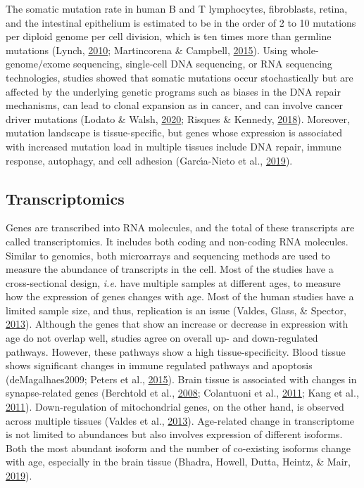 \documentclass[12pt,twoside]{unicam}
\begin{document}
The somatic mutation rate in human B and T lymphocytes, fibroblasts, retina, and the intestinal epithelium is estimated to be in the order of 2 to 10 mutations per diploid genome per cell division, which is ten times more than germline mutations (Lynch, \protect\hyperlink{ref-Lynch2010}{2010}; Martincorena \& Campbell, \protect\hyperlink{ref-Martincorena2015}{2015}). Using whole-genome/exome sequencing, single-cell DNA sequencing, or RNA sequencing technologies, studies showed that somatic mutations occur stochastically but are affected by the underlying genetic programs such as biases in the DNA repair mechanisms, can lead to clonal expansion as in cancer, and can involve cancer driver mutations (Lodato \& Walsh, \protect\hyperlink{ref-Lodato2020}{2020}; Risques \& Kennedy, \protect\hyperlink{ref-Risques2018}{2018}). Moreover, mutation landscape is tissue-specific, but genes whose expression is associated with increased mutation load in multiple tissues include DNA repair, immune response, autophagy, and cell adhesion (Garcı́a-Nieto et al., \protect\hyperlink{ref-Garcia-Nieto2019}{2019}).

\hypertarget{transcriptomics}{%
\subsection{Transcriptomics}\label{transcriptomics}}

Genes are transcribed into RNA molecules, and the total of these transcripts are called transcriptomics. It includes both coding and non-coding RNA molecules. Similar to genomics, both microarrays and sequencing methods are used to measure the abundance of transcripts in the cell. Most of the studies have a cross-sectional design, \emph{i.e.} have multiple samples at different ages, to measure how the expression of genes changes with age. Most of the human studies have a limited sample size, and thus, replication is an issue (Valdes, Glass, \& Spector, \protect\hyperlink{ref-Valdes2013}{2013}). Although the genes that show an increase or decrease in expression with age do not overlap well, studies agree on overall up- and down-regulated pathways. However, these pathways show a high tissue-specificity. Blood tissue shows significant changes in immune regulated pathways and apoptosis (deMagalhaes2009; Peters et al., \protect\hyperlink{ref-Peters2015}{2015}). Brain tissue is associated with changes in synapse-related genes (Berchtold et al., \protect\hyperlink{ref-Berchtold2008}{2008}; Colantuoni et al., \protect\hyperlink{ref-Colantuoni2011}{2011}; Kang et al., \protect\hyperlink{ref-Kang2011}{2011}). Down-regulation of mitochondrial genes, on the other hand, is observed across multiple tissues (Valdes et al., \protect\hyperlink{ref-Valdes2013}{2013}). Age-related change in transcriptome is not limited to abundances but also involves expression of different isoforms. Both the most abundant isoform and the number of co-existing isoforms change with age, especially in the brain tissue (Bhadra, Howell, Dutta, Heintz, \& Mair, \protect\hyperlink{ref-Bhadra2019}{2019}).
\end{document}
